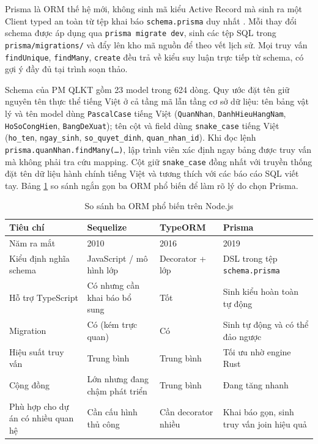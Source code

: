\documentclass[../DoAn.tex]{subfiles}
\begin{document}
Prisma là ORM thế hệ mới, không sinh mã kiểu Active Record mà sinh ra một Client typed an toàn từ tệp khai báo \texttt{schema.prisma} duy nhất \cite{prismadocs}. Mỗi thay đổi schema được áp dụng qua \texttt{prisma migrate dev}, sinh các tệp SQL trong \texttt{prisma/migrations/} và đẩy lên kho mã nguồn để theo vết lịch sử. Mọi truy vấn \texttt{findUnique}, \texttt{findMany}, \texttt{create} đều trả về kiểu suy luận trực tiếp từ schema, có gợi ý đầy đủ tại trình soạn thảo.

Schema của PM QLKT gồm 23 model trong 624 dòng. Quy ước đặt tên giữ nguyên tên thực thể tiếng Việt ở cả tầng mã lẫn tầng cơ sở dữ liệu: tên bảng vật lý và tên model dùng \texttt{PascalCase} tiếng Việt (\texttt{QuanNhan}, \texttt{DanhHieuHangNam}, \texttt{HoSoCongHien}, \texttt{BangDeXuat}); tên cột và field dùng \texttt{snake\_case} tiếng Việt (\texttt{ho\_ten}, \texttt{ngay\_sinh}, \texttt{so\_quyet\_dinh}, \texttt{quan\_nhan\_id}). Khi đọc lệnh \texttt{prisma.quanNhan.findMany(\dots)}, lập trình viên xác định ngay bảng được truy vấn mà không phải tra cứu mapping. Cột giữ \texttt{snake\_case} đồng nhất với truyền thống đặt tên dữ liệu hành chính tiếng Việt và tương thích với các báo cáo SQL viết tay. Bảng \ref{tab:so-sanh-orm} so sánh ngắn gọn ba ORM phổ biến để làm rõ lý do chọn Prisma.

\begin{table}[H]
\centering
\caption{So sánh ba ORM phổ biến trên Node.js}
\label{tab:so-sanh-orm}
\begin{tabular}{|p{4cm}|p{3cm}|p{3cm}|p{4cm}|}
\hline
\textbf{Tiêu chí} & \textbf{Sequelize} & \textbf{TypeORM} & \textbf{Prisma} \\ \hline
Năm ra mắt & 2010 & 2016 & 2019 \\ \hline
Kiểu định nghĩa schema & JavaScript / mô hình lớp & Decorator + lớp & DSL trong tệp \texttt{schema.prisma} \\ \hline
Hỗ trợ TypeScript & Có nhưng cần khai báo bổ sung & Tốt & Sinh kiểu hoàn toàn tự động \\ \hline
Migration & Có (kém trực quan) & Có & Sinh tự động và có thể đảo ngược \\ \hline
Hiệu suất truy vấn & Trung bình & Trung bình & Tối ưu nhờ engine Rust \\ \hline
Cộng đồng & Lớn nhưng đang chậm phát triển & Trung bình & Đang tăng nhanh \\ \hline
Phù hợp cho dự án có nhiều quan hệ & Cần cấu hình thủ công & Cần decorator nhiều & Khai báo gọn, sinh truy vấn join hiệu quả \\ \hline
\end{tabular}
\end{table}
\end{document}
